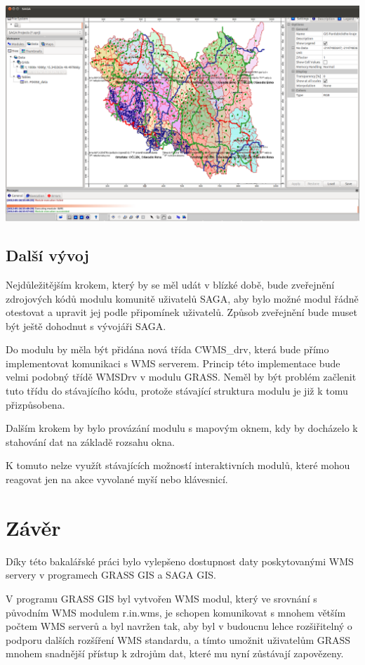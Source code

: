 \documentclass[a4paper,12pt]{article}
\begin{document}
 \includegraphics[scale=0.25]{figures/SAGA_okno4.png}
\subsection{Další vývoj}

Nejdůležitějším krokem, který by se měl udát v blízké době, bude
zveřejnění zdrojových kódů modulu komunitě uživatelů SAGA, aby bylo
možné modul řádně otestovat a upravit jej podle připomínek
uživatelů. Způsob zveřejnění bude muset být ještě dohodnut s vývojáři
SAGA.

Do modulu by měla být přidána nová třída CWMS\_drv, která bude přímo
implementovat komunikaci s WMS serverem. Princip této implementace
bude velmi podobný třídě WMSDrv v modulu GRASS. Neměl by být problém
začlenit tuto třídu do stávajícího kódu, protože stávající struktura
modulu je již k tomu přizpůsobena.

Dalším krokem by bylo provázání modulu s mapovým oknem, kdy by
docházelo k stahování dat na základě rozsahu okna.

K tomuto nelze využít stávajících možností interaktivních modulů,
které mohou reagovat jen na akce vyvolané myší nebo klávesnicí.

\newpage 
\section{Závěr}

Díky této bakalářské práci bylo vylepšeno dostupnost daty
poskytovanými WMS servery v programech GRASS GIS a SAGA GIS.

V programu GRASS GIS byl vytvořen WMS modul, který ve srovnání s
původním WMS modulem r.in.wms, je schopen komunikovat s mnohem větším
počtem WMS serverů a byl navržen tak, aby byl v budoucnu lehce
rozšiřitelný o podporu dalších rozšíření WMS standardu, a tímto
umožnit uživatelům GRASS mnohem snadnější přístup k zdrojům dat, které
mu nyní zůstávají zapovězeny.
\end{document}
